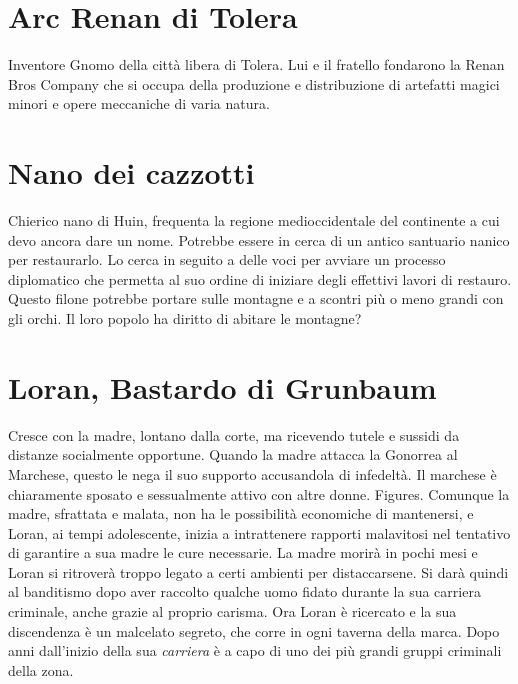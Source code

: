 
\section{Arc Renan di Tolera}
Inventore Gnomo della città libera di Tolera. Lui e il fratello fondarono la Renan Bros Company che si occupa della produzione e distribuzione di artefatti magici minori e opere meccaniche di varia natura.

\section{Nano dei cazzotti}
Chierico nano di Huin, frequenta la regione medioccidentale del continente a cui devo ancora dare un nome. Potrebbe essere in cerca di un antico santuario nanico per restaurarlo. Lo cerca in seguito a delle voci per avviare un processo diplomatico che permetta al suo ordine di iniziare degli effettivi lavori di restauro. Questo filone potrebbe portare sulle montagne e a scontri più o meno grandi con gli orchi. Il loro popolo ha diritto di abitare le montagne? 

\section{Loran, Bastardo di Grunbaum}
Cresce con la madre, lontano dalla corte, ma ricevendo tutele e sussidi da distanze socialmente opportune. Quando la madre attacca la Gonorrea al Marchese, questo le nega il suo supporto accusandola di infedeltà. Il marchese è chiaramente sposato e sessualmente attivo con altre donne. Figures.
Comunque la madre, sfrattata e malata, non ha le possibilità economiche di mantenersi, e Loran, ai tempi adolescente, inizia a intrattenere rapporti malavitosi nel tentativo di garantire a sua madre le cure necessarie. La madre morirà in pochi mesi e Loran si ritroverà troppo legato a certi ambienti per distaccarsene.
Si darà quindi al banditismo dopo aver raccolto qualche uomo fidato durante la sua carriera criminale, anche grazie al proprio carisma.
Ora Loran è ricercato e la sua discendenza è un malcelato segreto, che corre in ogni taverna della marca. Dopo anni dall'inizio della sua \textit{carriera} è a capo di uno dei più grandi gruppi criminali della zona.